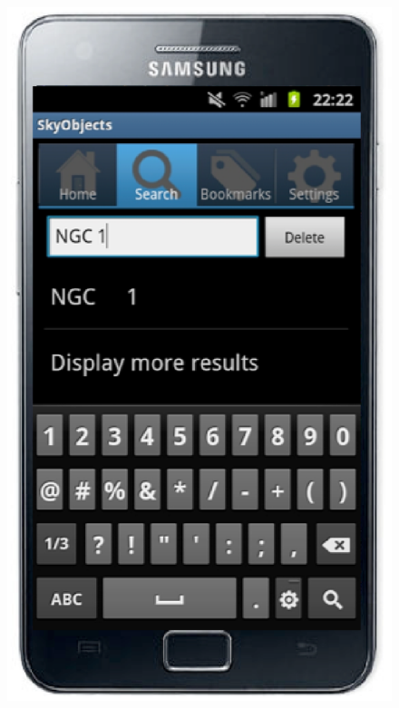 \begin{figure}[ht] \center
\includegraphics[scale=0.28]{part5/Schaaff_O28/O28_f5.eps}

\end{figure}
